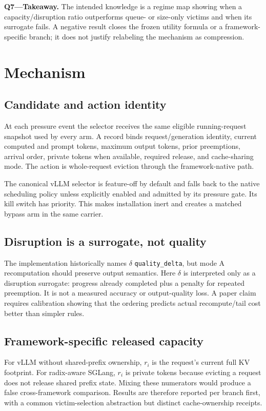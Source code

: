 \documentclass[10pt,twocolumn]{article}
\begin{document}
\textbf{Q7---Takeaway.} The intended knowledge is a regime map showing when a capacity/disruption ratio outperforms queue- or size-only victims and when its surrogate fails. A negative result closes the frozen utility formula or a framework-specific branch; it does not justify relabeling the mechanism as compression.

\section{Mechanism}
\subsection{Candidate and action identity}
At each pressure event the selector receives the same eligible running-request snapshot used by every arm. A record binds request/generation identity, current computed and prompt tokens, maximum output tokens, prior preemptions, arrival order, private tokens when available, required release, and cache-sharing mode. The action is whole-request eviction through the framework-native path.

The canonical vLLM selector is feature-off by default and falls back to the native scheduling policy unless explicitly enabled and admitted by its pressure gate. Its kill switch has priority. This makes installation inert and creates a matched bypass arm in the same carrier.

\subsection{Disruption is a surrogate, not quality}
The implementation historically names $\delta$ \texttt{quality\_delta}, but mode A recomputation should preserve output semantics. Here $\delta$ is interpreted only as a disruption surrogate: progress already completed plus a penalty for repeated preemption. It is not a measured accuracy or output-quality loss. A paper claim requires calibration showing that the ordering predicts actual recompute/tail cost better than simpler rules.

\subsection{Framework-specific released capacity}
For vLLM without shared-prefix ownership, $r_i$ is the request's current full KV footprint. For radix-aware SGLang, $r_i$ is private tokens because evicting a request does not release shared prefix state. Mixing these numerators would produce a false cross-framework comparison. Results are therefore reported per branch first, with a common victim-selection abstraction but distinct cache-ownership receipts.
\end{document}
